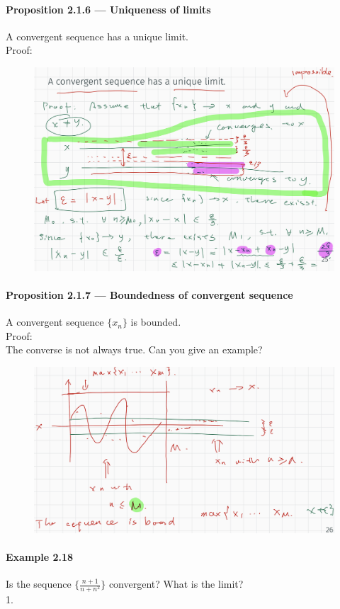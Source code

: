 \documentclass{article}
\begin{document}
\paragraph{Proposition 2.1.6 — Uniqueness of limits}
A convergent sequence has a unique limit.\\
Proof:
\begin{figure}[H]
    \centering
    \includegraphics{0124}
\end{figure}
\paragraph{Proposition 2.1.7 — Boundedness of convergent sequence}
A convergent sequence $\{x_n\}$ is bounded.\\
Proof:\\
The converse is not always true. Can you give an example?
\begin{figure}[H]
    \centering
    \includegraphics{0125}
\end{figure}
\paragraph{Example 2.18}
Is the sequence $\{\frac{n+1}{n+n^2}\}$ convergent? What is the limit?\\
1.
\end{document}
